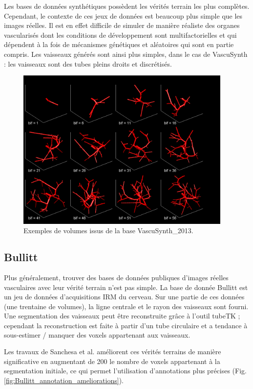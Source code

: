 Les bases de données synthétiques possèdent les vérités terrain les plus complètes. Cependant, le contexte de ces jeux de données est beaucoup plus simple que les images réelles. Il est en effet difficile de simuler de manière réaliste des organes vascularisés dont les conditions de développement sont multifactorielles et qui dépendent à la fois de mécanismes génétiques et aléatoires qui sont en partie compris. Les vaisseaux générés sont ainsi plus simples, dans le cas de VascuSynth : les vaisseaux sont des tubes pleins droits et discrétisés.

\begin{figure}
    \centering
    \includegraphics[height=8cm]{Images/snapVascu.png}
    \caption{Exemples de volumes issus de la base VascuSynth\_2013.}
    \label{fig:VascuSynth}
\end{figure}

\subsection{Bullitt}

Plus généralement, trouver des bases de données publiques d'images réelles vasculaires avec leur vérité terrain n'est pas simple. La base de donnée Bullitt est un jeu de données d'acquisitions IRM du cerveau. Sur une partie de ces données (une trentaine de volumes), la ligne centrale et le rayon des vaisseaux sont fourni. Une segmentation des vaisseaux peut être reconstruite grâce à l'outil tubeTK ; cependant la reconstruction est faite à partir d'un tube circulaire et a tendance à sous-estimer / manquer des voxels appartenant aux vaisseaux.

Les travaux de Sanchesa et al. \cite{Sanchesa2019_annotations_deep} améliorent ces vérités terrains de manière significative en augmentant de 200 \percent{} le nombre de voxels appartenant à la segmentation initiale, ce qui permet l'utilisation d'annotations plus précises (Fig.  \ref{fig:Bullitt_annotation_ameliorations}).

